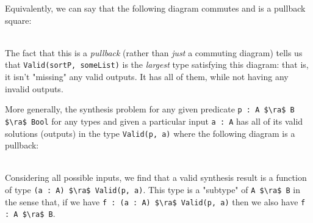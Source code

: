 \documentclass[10pt]{article}
\begin{document}
%

\noindent
Equivalently, we can say that the following diagram commutes and is a pullback square:
\\

\\

\noindent
The fact that this is a \textit{pullback} (rather than \textit{just} a commuting diagram) tells us that \lstinline{Valid(sortP, someList)} is the
\textit{largest} type satisfying this diagram: that is, it isn't "missing" any valid outputs. It has all of them, while not having any invalid outputs.

More generally, the synthesis problem for any given predicate \lstinline{p : A $\ra$ B $\ra$ Bool} for any types  and  given a particular
input \lstinline{a : A} has all of its valid solutions (outputs) in the type \lstinline{Valid(p, a)} where the following diagram is a pullback:
\\

\\

\noindent
Considering all possible inputs, we find that a valid synthesis result is a function of type \lstinline{(a : A) $\ra$ Valid(p, a)}. This type is
a "subtype" of \lstinline{A $\ra$ B} in the sense that, if we have \lstinline{f : (a : A) $\ra$ Valid(p, a)} then we also have \lstinline{f : A $\ra$ B}.


\end{document}
